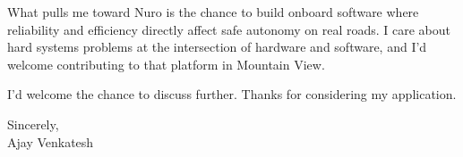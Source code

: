 \documentclass[letterpaper,11pt]{article}
\begin{document}
What pulls me toward Nuro is the chance to build onboard software where reliability and efficiency directly affect safe autonomy on real roads. I care about hard systems problems at the intersection of hardware and software, and I'd welcome contributing to that platform in Mountain View.

I'd welcome the chance to discuss further. Thanks for considering my application.

\vspace{12pt}
Sincerely, \\
Ajay Venkatesh
\end{document}
